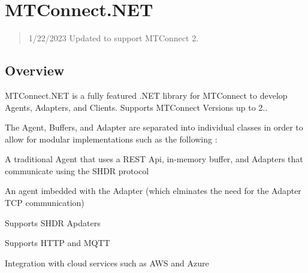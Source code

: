 

\section*{M\+T\+Connect.\+N\+ET}

\href{https://github.com/TrakHound/MTConnect.NET/actions/workflows/dotnet.yml}{\tt } \href{https://github.com/TrakHound/MTConnect.NET/releases/latest}{\tt } \href{https://www.nuget.org/packages/MTConnect.NET}{\tt }

\begin{quote}
1/22/2023 Updated to support M\+T\+Connect 2. \end{quote}


\subsection*{Overview}

M\+T\+Connect.\+N\+ET is a fully featured .N\+ET library for M\+T\+Connect to develop Agents, Adapters, and Clients. Supports M\+T\+Connect Versions up to 2..

The Agent, Buffers, and Adapter are separated into individual classes in order to allow for modular implementations such as the following \+:


\begin{DoxyItemize}
\item A traditional Agent that uses a R\+E\+ST Api, in-\/memory buffer, and Adapters that communicate using the S\+H\+DR protocol
\item An agent imbedded with the Adapter (which elminates the need for the Adapter T\+CP communication)
\item Supports S\+H\+DR Apdaters
\item Supports H\+T\+TP and M\+Q\+TT
\item Integration with cloud services such as A\+WS and Azure
\end{DoxyItemize}

